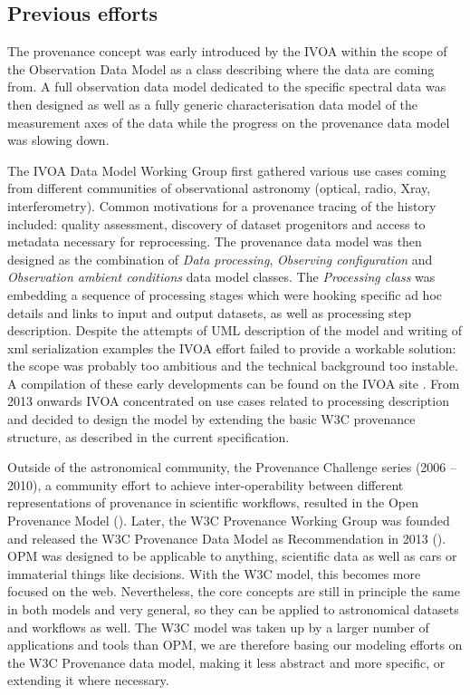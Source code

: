 \subsection{Previous efforts}
The provenance concept was early introduced by the IVOA within the scope of the Observation Data Model \citep[see IVOA note][]{note:observationdm} as a class describing where the data are coming from. A full observation data model dedicated to the specific spectral data was then designed \citep[Spectral Data Model,][]{std:SpectralDM} as well as a fully generic characterisation data model of the measurement axes of the data \citep[Characterisation Data Model,][]{std:CharacterisationDM} while the progress on the provenance data model was slowing down.

The IVOA Data Model Working Group first gathered various use cases coming from different communities of observational astronomy (optical, radio, Xray, interferometry). Common motivations for a provenance tracing of the history included: quality assessment, discovery of dataset progenitors and access to metadata necessary for reprocessing. The provenance data model was then designed as the combination of \emph{Data processing}, \emph{Observing configuration} and \emph{Observation ambient conditions} data model classes. 
The \emph{Processing class} was embedding a sequence of processing stages which were hooking specific ad hoc details and links to input and output datasets, as well as processing step description. 
Despite the attempts of UML description of the model and writing of xml serialization examples the IVOA effort failed to provide a workable solution: the scope was probably too ambitious and the technical background too instable. A compilation of these early developments can be found on the IVOA site \citep{std:previousefforts}. From 2013 onwards IVOA concentrated on use cases related to processing description and decided to design the model by extending the basic W3C provenance structure, as described in the current specification. 

Outside of the astronomical community, the Provenance Challenge series (2006 -- 2010), a community effort to achieve inter-operability between different representations of provenance in scientific workflows, resulted in the Open Provenance Model (\cite{moreau2010}). 
Later, the W3C Provenance Working Group was founded and released the W3C Provenance Data Model as Recommendation in 2013 (\cite{std:W3CProvDM}). 
OPM was designed to be applicable to anything, scientific data as well as cars or immaterial things like decisions. With the W3C model, this becomes more focused on the web.  Nevertheless, the core concepts are still in principle the same in both models and very general, so they can be applied to astronomical datasets and workflows as well. 
The W3C model was taken up by a larger number of applications and tools than OPM, we are therefore basing our modeling efforts on the W3C Provenance data model, making it less abstract and more specific, or extending it where necessary. 


